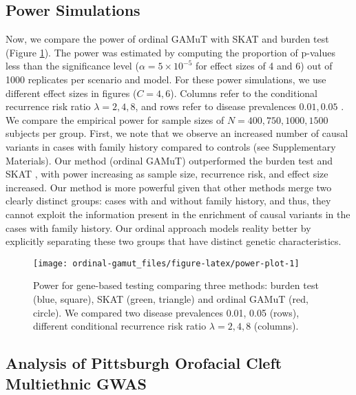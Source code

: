 \documentclass[]{article}
\theoremstyle{definition}
\theoremstyle{definition}
\theoremstyle{definition}
\theoremstyle{remark}
\begin{document}
\hypertarget{power-simulations}{%
\subsection{Power Simulations}\label{power-simulations}}

Now, we compare the power of ordinal GAMuT with SKAT and burden test
(Figure \ref{fig:power-plot}). The power was estimated by computing the
proportion of p-values less than the significance level
(\(\alpha=5 \times 10^{-5}\) for effect sizes of 4 and 6) out of 1000
replicates per scenario and model. For these power simulations, we use
different effect sizes in figures (\(C=4,6\)). Columns refer to the
conditional recurrence risk ratio \(\lambda=2,4,8\), and rows refer to
disease prevalences \(0.01,0.05\) . We compare the empirical power for
sample sizes of \(N=400,750,1000,1500\) subjects per group. First, we
note that we observe an increased number of causal variants in cases
with family history compared to controls (see Supplementary Materials).
Our method (ordinal GAMuT) outperformed the burden test \citep{Li2008}
and SKAT \citep{Wu2011}, with power increasing as sample size,
recurrence risk, and effect size increased. Our method is more powerful
given that other methods merge two clearly distinct groups: cases with
and without family history, and thus, they cannot exploit the
information present in the enrichment of causal variants in the cases
with family history. Our ordinal approach models reality better by
explicitly separating these two groups that have distinct genetic
characteristics.

\begin{figure}

{\centering \texttt{[image: ordinal-gamut\_files/figure-latex/power-plot-1]} 

}

\caption{Power for gene-based testing comparing three methods: burden test (blue, square), SKAT (green, triangle) and ordinal GAMuT (red, circle). We compared two disease prevalences 0.01, 0.05 (rows), different conditional recurrence risk ratio $\lambda=2,4,8$ (columns).}\label{fig:power-plot}
\end{figure}

\hypertarget{analysis-of-pittsburgh-orofacial-cleft-multiethnic-gwas-1}{%
\subsection{Analysis of Pittsburgh Orofacial Cleft Multiethnic
GWAS}\label{analysis-of-pittsburgh-orofacial-cleft-multiethnic-gwas-1}}
\end{document}
